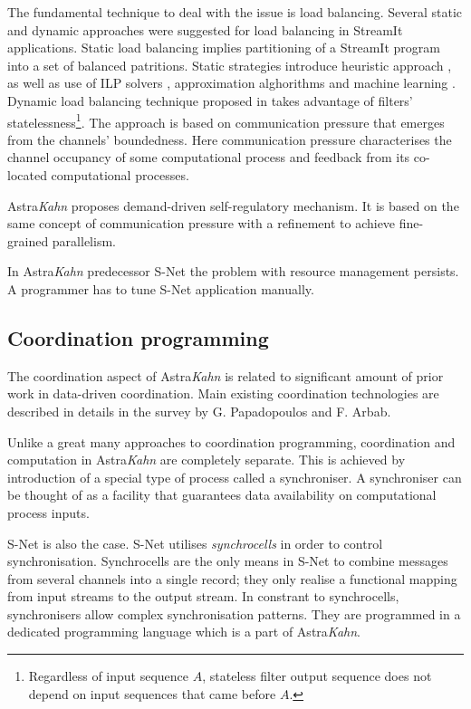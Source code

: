 \documentclass{article}
\begin{document}
The fundamental technique to deal with the issue is load balancing. Several static and dynamic approaches were suggested for load balancing in StreamIt applications. Static load balancing implies partitioning of a StreamIt program into a set of balanced patritions. Static strategies introduce heuristic approach \cite{streamit}, as well as use of ILP solvers \cite{kudlur}, approximation alghorithms \cite{farhad} and machine learning \cite{wang}. Dynamic load balancing technique proposed in \cite{collins} takes advantage of filters' statelessness\footnote{Regardless of input sequence $A$, stateless filter output sequence does not depend on input sequences that came before $A$.}. The approach is based on communication pressure that emerges from the channels' boundedness. Here communication pressure characterises the channel occupancy of some computational process and feedback from its co-located computational processes.

Astra\emph{Kahn} proposes demand-driven self-regulatory mechanism. It is based on the same concept of communication pressure with a refinement to achieve fine-grained parallelism.

In Astra\emph{Kahn} predecessor S-Net \cite{snet_intro} the problem with resource management persists. A programmer has to tune S-Net application manually.

\subsection{Coordination programming}
The coordination aspect of Astra\emph{Kahn} is related to significant amount of prior work in data-driven coordination. Main existing coordination technologies are described in details in the survey \cite{papadopoulos} by G. Papadopoulos and F. Arbab.

Unlike a great many approaches to coordination programming, coordination and computation in Astra\emph{Kahn} are completely separate. This is achieved by introduction of a special type of process called a synchroniser. A synchroniser can be thought of as a facility that guarantees data availability on computational process inputs.

S-Net is also the case. S-Net utilises \emph{synchrocells} in order to control synchronisation. Synchrocells are the only means in S-Net to combine messages from several channels into a single record; they only realise a functional mapping from input streams to the output stream. In constrant to synchrocells, synchronisers allow complex synchronisation patterns. They are programmed in a dedicated programming language which is a part of Astra\emph{Kahn}.
\end{document}
